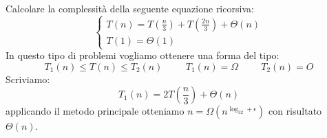  \begin{exercise}
    Calcolare la complessità della seguente equazione ricorsiva:
    $$\begin{cases}T(n)=T(\frac{n}{3})+T(\frac{2n}{3})+\Theta(n)\\T(1)=\Theta(1)\end{cases}$$
    In questo tipo di problemi vogliamo ottenere una forma del tipo:
    \begin{equation*}T_1(n)\leq T(n)\leq T_2(n)\hspace{1cm}T_1(n)=\Omega\hspace{1cm}T_2(n)=O\end{equation*}
    Scriviamo:
    \begin{equation*}
        T_1(n)=2T(\frac{n}{3})+\Theta(n)
    \end{equation*}
    applicando il metodo principale otteniamo $n=\Omega(n^{\log_32+\epsilon})$ con risultato $\Theta(n)$.
    

\end{exercise}
